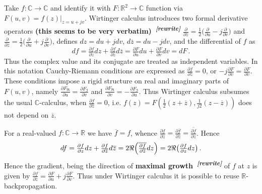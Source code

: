 \documentclass[a4paper,10pt]{article}
\newcommand{\attn}[2]{\textbf{\color{red} #2~\textsuperscript{\textit{[#1]}}}}
\newcommand{\rewrite}[1]{\attn{rewrite}{#1}}
\newcommand{\real}{\mathbb{R}}
\newcommand{\cplx}{\mathbb{C}}
\newcommand{\conj}[1]{\overline{#1}}
\begin{document}
Take $f\colon \cplx \to \cplx$ and identify it with $F\colon \real^2 \to \cplx$ function
via $F(u, v) = f(z)\vert_{z=u + j v}$. Wirtinger calculus introduces two formal derivative
operators \rewrite{(this seems to be very verbatim)}
$
  \tfrac{\partial}{\partial z}
    = \tfrac12 \bigl(
      \tfrac{\partial}{\partial u}
      - j \tfrac{\partial}{\partial v}
    \bigr)
$ and $
  \tfrac{\partial}{\partial \conj{z}}
    = \tfrac12 \bigl(
      \tfrac{\partial}{\partial u}
      + j \tfrac{\partial}{\partial v}
    \bigr)
$, defines $dz = du + j dv$, $d\conj{z} = du - j dv$, and the differential of $f$ as
$$
df = \tfrac{\partial f}{\partial z} dz
    + \tfrac{\partial f}{\partial \conj{z}} d\conj{z}
   = \tfrac{\partial F}{\partial u} du
     + \tfrac{\partial F}{\partial v} dv
   = dF
  \,. $$
Thus the complex value and its conjugate are treated as independent variables. In this notation
Cauchy-Riemann conditions are expressed as $
  \tfrac{\partial f}{\partial \conj{z}} = 0
$, or $
  -j\tfrac{\partial F}{\partial v} = \tfrac{\partial F}{\partial v}
$. These conditions impose a rigid structure on real and imaginary parts of $F(u, v)$, namely $
  \tfrac{\partial F_{\Re }}{\partial u} = \tfrac{\partial F_{\Im }}{\partial v}
$ and $
  \tfrac{\partial F_{\Re }}{\partial v} = - \tfrac{\partial F_{\Im }}{\partial u}
$. Thus Wirtinger calculus subsumes the usual $\cplx$-calculus, when $
  \tfrac{\partial f}{\partial \conj{z}} = 0
$, i.e. $
  f(z)
    = F(\tfrac12 (z + \conj{z}), \tfrac1{j 2} (z - \conj{z}))
$ does not depend on $\conj{z}$.

For a real-valued $f\colon \cplx \to \real$ we have $\conj{f} = f$, whence $
  \tfrac{\partial f}{\partial \conj{z}}
    = \tfrac{\partial \conj{f}}{\partial \conj{z}}
    = \conj{\tfrac{\partial f}{\partial z}}
$. Hence
$$
df
  = \tfrac{\partial f}{\partial z} dz
    + \tfrac{\partial f}{\partial \conj{z}} d\conj{z}
  = 2 \Re \Bigl(
    \conj{\tfrac{\partial f}{\partial \conj{z}}} dz
  \Bigr)
  = 2 \Re \bigl(
    \tfrac{\partial f}{\partial z} dz
  \bigr)
  \,. $$
Hence the gradient, being the direction of \rewrite{maximal growth} of $f$ at $z$ is given by $
  \tfrac{\partial f}{\partial \conj{z}}
    = \tfrac{\partial F}{\partial u}
      + j \tfrac{\partial F}{\partial v}
$. Thus under Wirtinger calculus it is possible to reuse $\real$-backpropagation.
\end{document}
